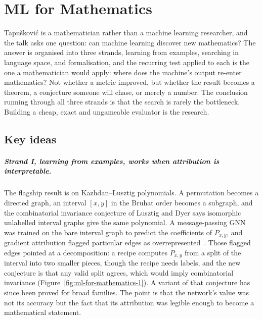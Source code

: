 \chapter{ML for Mathematics}
\label{ch:08-ml-for-mathematics}


Tapu\v{s}kovi\'{c} is a mathematician rather than a machine learning researcher, and the talk
asks one question: can machine learning discover new mathematics? The answer is organised into
three strands, learning from examples, searching in language space, and formalisation, and the
recurring test applied to each is the one a mathematician would apply: where does the machine's
output re-enter mathematics? Not whether a metric improved, but whether the result becomes a
theorem, a conjecture someone will chase, or merely a number. The conclusion running through all
three strands is that the search is rarely the bottleneck. Building a cheap, exact and
ungameable evaluator is the research.

\section*{Key ideas}

\paragraph{Strand I, learning from examples, works when attribution is interpretable.} The
flagship result is on Kazhdan--Lusztig polynomials. A permutation becomes a directed graph, an
interval $[x,y]$ in the Bruhat order becomes a subgraph, and the combinatorial invariance
conjecture of Lusztig and Dyer says isomorphic unlabelled interval graphs give the same
polynomial. A message-passing GNN was trained on the bare interval graph to predict the
coefficients of $P_{x,y}$, and gradient attribution flagged particular edges as
overrepresented~\citep{davies2021}. Those flagged edges pointed at a decomposition: a recipe
computes $P_{x,y}$ from a split of the interval into two smaller pieces, though the recipe needs
labels, and the new conjecture is that any valid split agrees, which would imply combinatorial
invariance (Figure~\ref{fig:ml-for-mathematics-1}). A variant of that conjecture has since been
proved for broad families. The point is that the network's value was not its accuracy but the
fact that its attribution was legible enough to become a mathematical statement.

